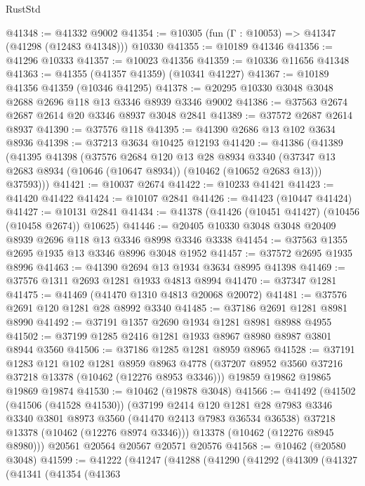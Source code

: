 \begin{lexlean}{RustStd}
\begin{coremodule}
@41348 := @41332 @9002
@41354 := @10305 (fun (Γ : @10053) => @41347 (@41298 (@12483 @41348))) @10330
@41355 := @10189 @41346
@41356 := @41296 @10333
@41357 := @10023 @41356
@41359 := @10336 @11656 @41348
@41363 := @41355 (@41357 @41359) (@10341 @41227)
@41367 := @10189 @41356 @41359 (@10346 @41295)
@41378 := @20295 @10330 @3048 @3048 @2688 @2696 @118 @13 @3346 @8939 @3346 @9002
@41386 := @37563 @2674 @2687 @2614 @20 @3346 @8937 @3048 @2841
@41389 := @37572 @2687 @2614 @8937
@41390 := @37576 @118
@41395 := @41390 @2686 @13 @102 @3634 @8936
@41398 := @37213 @3634 @10425 @12193
@41420 := @41386
    (@41389
      (@41395
        @41398
        (@37576
          @2684
          @120
          @13
          @28
          @8934
          @3340
          (@37347 @13 @2683 @8934 (@10646 (@10647 @8934)) (@10462 (@10652 @2683 @13)))
          @37593)))
@41421 := @10037 @2674
@41422 := @10233 @41421
@41423 := @41420 @41422
@41424 := @10107 @2841
@41426 := @41423 (@10447 @41424)
@41427 := @10131 @2841
@41434 := @41378 (@41426 (@10451 @41427) (@10456 (@10458 @2674)) @10625)
@41446 := @20405 @10330 @3048 @3048 @20409 @8939 @2696 @118 @13 @3346 @8998 @3346 @3338
@41454 := @37563 @1355 @2695 @1935 @13 @3346 @8996 @3048 @1952
@41457 := @37572 @2695 @1935 @8996
@41463 := @41390 @2694 @13 @1934 @3634 @8995 @41398
@41469 := @37576 @1311 @2693 @1281 @1933 @4813 @8994
@41470 := @37347 @1281
@41475 := @41469 (@41470 @1310 @4813 @20068 @20072)
@41481 := @37576 @2691 @120 @1281 @28 @8992 @3340
@41485 := @37186 @2691 @1281 @8981 @8990
@41492 := @37191 @1357 @2690 @1934 @1281 @8981 @8988 @4955
@41502 := @37199 @1285 @2416 @1281 @1933 @8967 @8980 @8987 @3801 @8944 @3560
@41506 := @37186 @1285 @1281 @8959 @8965
@41528 := @37191
    @1283
    @121
    @102
    @1281
    @8959
    @8963
    @4778
    (@37207 @8952 @3560 @37216 @37218 @13378 (@10462 (@12276 @8953 @3346)))
    @19859
    @19862
    @19865
    @19869
    @19874
@41530 := @10462 (@19878 @3048)
@41566 := @41492
    (@41502
      (@41506 (@41528 @41530))
      (@37199
        @2414
        @120
        @1281
        @28
        @7983
        @3346
        @3340
        @3801
        @8973
        @3560
        (@41470 @2413 @7983 @36534 @36538)
        @37218
        @13378
        (@10462 (@12276 @8974 @3346)))
      @13378
      (@10462 (@12276 @8945 @8980)))
    @20561
    @20564
    @20567
    @20571
    @20576
@41568 := @10462 (@20580 @3048)
@41599 := @41222
    (@41247
      (@41288
        (@41290
          (@41292
            (@41309
              (@41327
                (@41341
                  (@41354
                    (@41363

\end{coremodule}
\end{lexlean}
